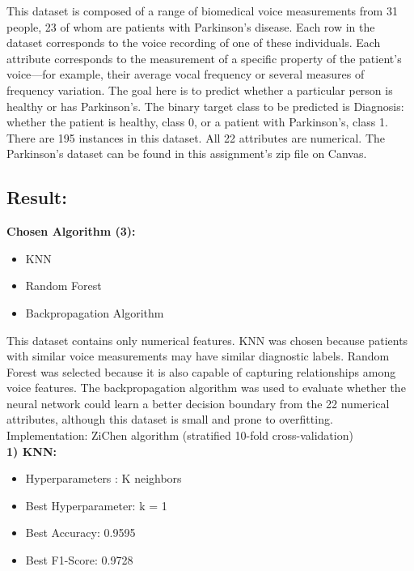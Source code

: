\documentclass[11pt]{article}
\begin{document}
This dataset is composed of a range of biomedical voice measurements from 31 people, 23 of whom are patients with Parkinson's disease. Each row in the dataset corresponds to the voice recording of one of these individuals. Each attribute corresponds to the measurement of a specific property of the patient's voice---for example, their average vocal frequency or several measures of frequency variation. The goal here is to predict whether a particular person is healthy or has Parkinson's. The binary target class to be predicted is Diagnosis: whether the patient is healthy, class 0, or a patient with Parkinson's, class 1. There are 195 instances in this dataset. All 22 attributes are numerical. The Parkinson's dataset can be found in this assignment's zip file on Canvas.

\noindent \subsection*{Result:}

\noindent \textbf{Chosen Algorithm (3):}
\begin{itemize}
    \item KNN
    \item Random Forest
    \item Backpropagation Algorithm
\end{itemize}


\noindent {}

\noindent This dataset contains only numerical features. KNN was chosen because patients with similar voice measurements may have similar diagnostic labels. Random Forest was selected because it is also capable of capturing relationships among voice features. The backpropagation algorithm was used to evaluate whether the neural network could learn a better decision boundary from the 22 numerical attributes, although this dataset is small and prone to overfitting.\\

\noindent Implementation: ZiChen algorithm (stratified 10-fold cross-validation)\\

\noindent \textbf{1) KNN:}
\begin{itemize}
    \item Hyperparameters : K neighbors
    \item Best Hyperparameter: k = 1
    \item Best Accuracy: 0.9595
    \item Best F1-Score: 0.9728
\end{itemize}
\end{document}
